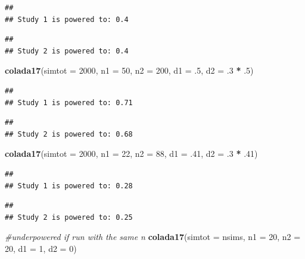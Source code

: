 \documentclass[
]{book}
\newenvironment{Shaded}{\begin{snugshade}}{\end{snugshade}}
\newcommand{\CommentTok}[1]{\textcolor[rgb]{0.56,0.35,0.01}{\textit{#1}}}
\newcommand{\DataTypeTok}[1]{\textcolor[rgb]{0.13,0.29,0.53}{#1}}
\newcommand{\DecValTok}[1]{\textcolor[rgb]{0.00,0.00,0.81}{#1}}
\newcommand{\FloatTok}[1]{\textcolor[rgb]{0.00,0.00,0.81}{#1}}
\newcommand{\KeywordTok}[1]{\textcolor[rgb]{0.13,0.29,0.53}{\textbf{#1}}}
\newcommand{\NormalTok}[1]{#1}
\newcommand{\OperatorTok}[1]{\textcolor[rgb]{0.81,0.36,0.00}{\textbf{#1}}}
\newcommand{\StringTok}[1]{\textcolor[rgb]{0.31,0.60,0.02}{#1}}
\begin{document}
\begin{verbatim}
## 
## Study 1 is powered to: 0.4
\end{verbatim}

\begin{verbatim}
## 
## Study 2 is powered to: 0.4
\end{verbatim}

\begin{Shaded}
\begin{Highlighting}[]
  \KeywordTok{colada17}\NormalTok{(}\DataTypeTok{simtot =} \DecValTok{2000}\NormalTok{, }\DataTypeTok{n1 =} \DecValTok{50}\NormalTok{, }\DataTypeTok{n2 =} \DecValTok{200}\NormalTok{, }\DataTypeTok{d1 =} \FloatTok{.5}\NormalTok{, }\DataTypeTok{d2 =} \FloatTok{.3} \OperatorTok{*}\StringTok{ }\FloatTok{.5}\NormalTok{)}
\end{Highlighting}
\end{Shaded}

\begin{verbatim}
## 
## Study 1 is powered to: 0.71
\end{verbatim}

\begin{verbatim}
## 
## Study 2 is powered to: 0.68
\end{verbatim}

\begin{Shaded}
\begin{Highlighting}[]
  \KeywordTok{colada17}\NormalTok{(}\DataTypeTok{simtot =} \DecValTok{2000}\NormalTok{, }\DataTypeTok{n1 =} \DecValTok{22}\NormalTok{, }\DataTypeTok{n2 =} \DecValTok{88}\NormalTok{, }\DataTypeTok{d1 =} \FloatTok{.41}\NormalTok{, }\DataTypeTok{d2 =} \FloatTok{.3} \OperatorTok{*}\StringTok{ }\FloatTok{.41}\NormalTok{)}
\end{Highlighting}
\end{Shaded}

\begin{verbatim}
## 
## Study 1 is powered to: 0.28
\end{verbatim}

\begin{verbatim}
## 
## Study 2 is powered to: 0.25
\end{verbatim}

\begin{Shaded}
\begin{Highlighting}[]
\CommentTok{#underpowered if run with the same n}
\KeywordTok{colada17}\NormalTok{(}\DataTypeTok{simtot =}\NormalTok{ nsims, }\DataTypeTok{n1 =} \DecValTok{20}\NormalTok{, }\DataTypeTok{n2 =} \DecValTok{20}\NormalTok{, }\DataTypeTok{d1 =} \DecValTok{1}\NormalTok{, }\DataTypeTok{d2 =} \DecValTok{0}\NormalTok{)  }
\end{Highlighting}
\end{Shaded}
\end{document}
